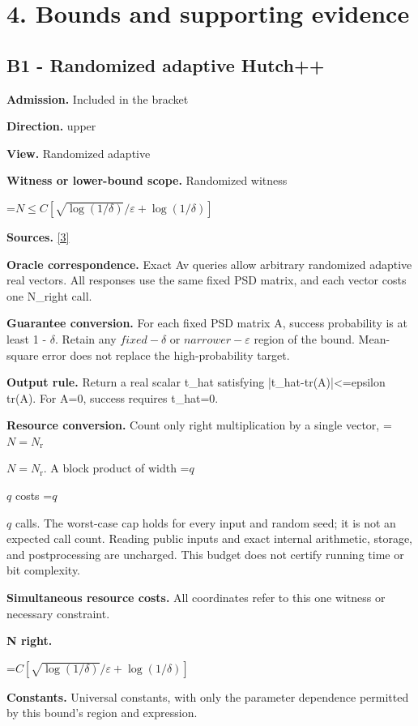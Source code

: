 \documentclass[10pt,a4paper]{article}
\newcommand{\AtlasMath}[1]{\par\begingroup\centering\setbox0=\hbox{$\displaystyle #1$}\ifdim\wd0>1.4\linewidth\typeout{ATLAS WIDE FORMULA: \the\wd0}\fi\ifdim\wd0>\linewidth\resizebox{\linewidth}{!}{\box0}\else\box0\fi\par\endgroup}
\newcommand{\AtlasInlineMath}[1]{\begingroup\setbox0=\hbox{$#1$}\ifdim\wd0>.4\linewidth\endgroup\AtlasMath{#1}\else\endgroup$#1$\fi}
\begin{document}
\section{4. Bounds and supporting evidence}
\subsection{B1 - Randomized adaptive Hutch++}
\textbf{Admission.} Included in the bracket

\textbf{Direction.} upper

\textbf{View.} Randomized adaptive

\textbf{Witness or lower-bound scope.} Randomized witness

\AtlasMath{N\le C[\sqrt{\log(1/\delta)}/\varepsilon+\log(1/\delta)]}
\textbf{Sources.} \href{https://arxiv.org/pdf/2010.09649v5}{[3]}

\textbf{Oracle correspondence.} Exact Av queries allow arbitrary randomized adaptive real vectors. All responses use the same fixed PSD matrix, and each vector costs one N\_\allowbreak{}right call.

\textbf{Guarantee conversion.} For each fixed PSD matrix A, success probability is at least 1 - $\delta$. Retain any $fixed-\delta$ or $narrower-\varepsilon$ region of the bound. Mean-square error does not replace the high-probability target.

\textbf{Output rule.} Return a real scalar t\_\allowbreak{}hat satisfying |t\_\allowbreak{}hat-tr(A)|<=epsilon tr(A). For A=0, success requires t\_\allowbreak{}hat=0.

\textbf{Resource conversion.} Count only right multiplication by a single vector, \AtlasInlineMath{N=N_{\mathrm r}}. A block product of width \AtlasInlineMath{q} costs \AtlasInlineMath{q} calls. The worst-case cap holds for every input and random seed; it is not an expected call count. Reading public inputs and exact internal arithmetic, storage, and postprocessing are uncharged. This budget does not certify running time or bit complexity.

\textbf{Simultaneous resource costs.} All coordinates refer to this one witness or necessary constraint.

\textbf{N right.}

\AtlasMath{C[\sqrt{\log(1/\delta)}/\varepsilon+\log(1/\delta)]}
\textbf{Constants.} Universal constants, with only the parameter dependence permitted by this bound’s region and expression.
\end{document}
